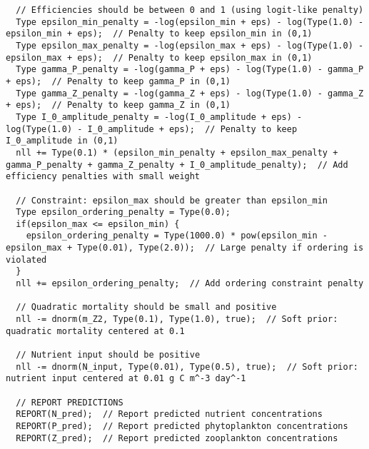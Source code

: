 \begin{lstlisting}
  // Efficiencies should be between 0 and 1 (using logit-like penalty)
  Type epsilon_min_penalty = -log(epsilon_min + eps) - log(Type(1.0) - epsilon_min + eps);  // Penalty to keep epsilon_min in (0,1)
  Type epsilon_max_penalty = -log(epsilon_max + eps) - log(Type(1.0) - epsilon_max + eps);  // Penalty to keep epsilon_max in (0,1)
  Type gamma_P_penalty = -log(gamma_P + eps) - log(Type(1.0) - gamma_P + eps);  // Penalty to keep gamma_P in (0,1)
  Type gamma_Z_penalty = -log(gamma_Z + eps) - log(Type(1.0) - gamma_Z + eps);  // Penalty to keep gamma_Z in (0,1)
  Type I_0_amplitude_penalty = -log(I_0_amplitude + eps) - log(Type(1.0) - I_0_amplitude + eps);  // Penalty to keep I_0_amplitude in (0,1)
  nll += Type(0.1) * (epsilon_min_penalty + epsilon_max_penalty + gamma_P_penalty + gamma_Z_penalty + I_0_amplitude_penalty);  // Add efficiency penalties with small weight
  
  // Constraint: epsilon_max should be greater than epsilon_min
  Type epsilon_ordering_penalty = Type(0.0);
  if(epsilon_max <= epsilon_min) {
    epsilon_ordering_penalty = Type(1000.0) * pow(epsilon_min - epsilon_max + Type(0.01), Type(2.0));  // Large penalty if ordering is violated
  }
  nll += epsilon_ordering_penalty;  // Add ordering constraint penalty
  
  // Quadratic mortality should be small and positive
  nll -= dnorm(m_Z2, Type(0.1), Type(1.0), true);  // Soft prior: quadratic mortality centered at 0.1
  
  // Nutrient input should be positive
  nll -= dnorm(N_input, Type(0.01), Type(0.5), true);  // Soft prior: nutrient input centered at 0.01 g C m^-3 day^-1
  
  // REPORT PREDICTIONS
  REPORT(N_pred);  // Report predicted nutrient concentrations
  REPORT(P_pred);  // Report predicted phytoplankton concentrations
  REPORT(Z_pred);  // Report predicted zooplankton concentrations
  

\end{lstlisting}
